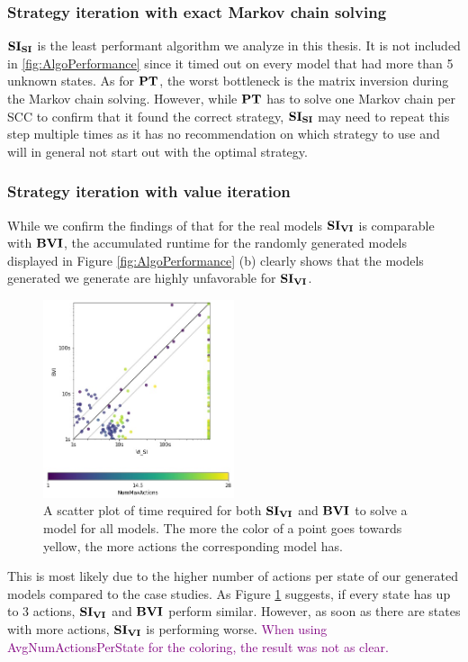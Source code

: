 \subsubsection*{Strategy iteration with exact Markov chain solving}
$\mathbf{SI_{SI}}$ is the least performant algorithm we analyze in this thesis.
It is not included in \ref{fig:AlgoPerformance} since it timed out on every model that had more than 5 unknown states.
As for $\mathbf{PT}$, the worst bottleneck is the matrix inversion during the Markov chain solving.
However, while $\mathbf{PT}$ has to solve one Markov chain per SCC to confirm that it found the correct strategy,
$\mathbf{SI_{SI}}$ may need to repeat this step multiple times as it has no recommendation on which strategy to use and will in general not start out with the optimal strategy.

\subsubsection*{Strategy iteration with value iteration}
While we confirm the findings of \cite{gandalf} that for the real models $\SI$ is comparable with $\BVI$, 
the accumulated runtime for the randomly generated models displayed in Figure \ref{fig:AlgoPerformance} (b) clearly shows that 
the models generated we generate are highly unfavorable for $\SI$.

\begin{figure}[h!]
    \centering
    \includegraphics[width=0.5\textwidth]{figures/colorScatter_SI_VI.jpg}
    \caption[$\SI$ compared to $\BVI$ based on MaxNumActions]{
        A scatter plot of time required for both $\SI$ and $\BVI$ to solve a model for all models.
        The more the color of a point goes towards yellow, the more actions the corresponding model has.
    }
    \label{fig:colorScatterSi}
\end{figure}
\FloatBarrier
This is most likely due to the higher number of actions per state of our generated models compared to the case studies.
As Figure \ref{fig:colorScatterSi} suggests, if every state has up to 3 actions, $\SI$ and $\BVI$ perform similar.
However, as soon as there are states with more  actions, $\SI$ is performing worse.
\textcolor{purple}{When using AvgNumActionsPerState for the coloring, the result was not as clear.}

